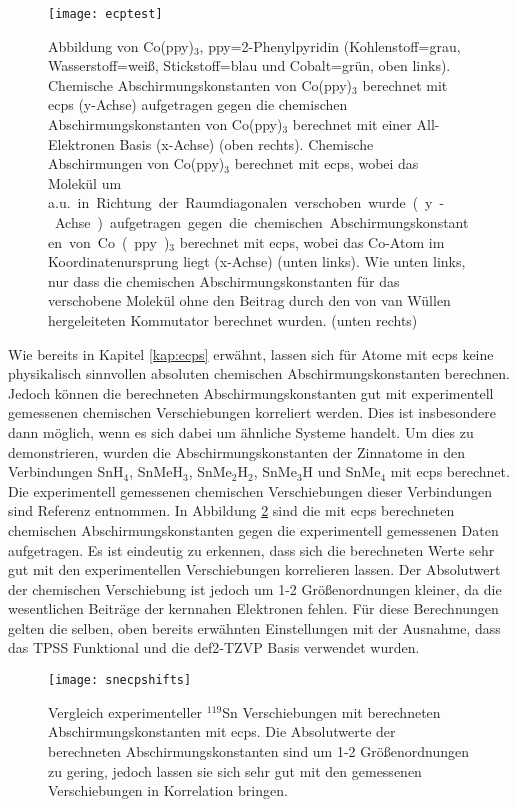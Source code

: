 \vfill
\newpage
\begin{figure}[ht!]
	\centering
	\texttt{[image: ecptest]}
	\captionsetup{figurewithin = chapter}
	\captionsetup{font=small, labelfont=bf}\caption[ECP-Testrechnungen an Co(ppy)$_3$]{Abbildung von Co(ppy)$_3$, ppy=2-Phenylpyridin (Kohlenstoff=grau, Wasserstoff=weiß, Stickstoff=blau und Cobalt=grün, oben links). Chemische Abschirmungskonstanten von Co(ppy)$_3$ berechnet mit \acp{ecp} (y-Achse) aufgetragen gegen die chemischen Abschirmungskonstanten von Co(ppy)$_3$ berechnet mit einer All-Elektronen Basis (x-Achse) (oben rechts). Chemische Abschirmungen von Co(ppy)$_3$  berechnet mit \acp{ecp}, wobei das Molekül um \unit[10]{a.u.} in Richtung der Raumdiagonalen verschoben wurde (y-Achse) aufgetragen gegen die chemischen Abschirmungskonstanten von Co(ppy)$_3$ berechnet mit \acp{ecp}, wobei das Co-Atom im Koordinatenursprung liegt (x-Achse) (unten links). Wie unten links, nur dass die chemischen Abschirmungskonstanten für das verschobene Molekül ohne den Beitrag durch den von van Wüllen hergeleiteten Kommutator berechnet wurden. (unten rechts)}
\label{abb:coppy3test}
\end{figure}
\vfill
\newpage

Wie bereits in Kapitel \ref{kap:ecps} erwähnt, lassen sich für Atome mit \acp{ecp} keine physikalisch sinnvollen absoluten chemischen Abschirmungskonstanten berechnen. Jedoch können die berechneten Abschirmungskonstanten gut mit experimentell gemessenen chemischen Verschiebungen korreliert werden. Dies ist insbesondere dann möglich, wenn es sich dabei um ähnliche Systeme handelt. Um dies zu demonstrieren, wurden die Abschirmungskonstanten der Zinnatome in den Verbindungen SnH$_4$, SnMeH$_3$, SnMe$_2$H$_2$, SnMe$_3$H und SnMe$_4$ mit \acp{ecp} berechnet. Die experimentell gemessenen chemischen Verschiebungen dieser Verbindungen sind Referenz \cite{vivas2002dft} entnommen. In Abbildung \ref{abb:snecpshifts} sind die mit \acp{ecp} berechneten chemischen Abschirmungskonstanten gegen die experimentell gemessenen Daten aufgetragen. Es ist eindeutig zu erkennen, dass sich die berechneten Werte sehr gut mit den experimentellen Verschiebungen korrelieren lassen. Der Absolutwert der chemischen Verschiebung ist jedoch um 1-2 Größenordnungen kleiner, da die wesentlichen Beiträge der kernnahen Elektronen fehlen. Für diese Berechnungen gelten die selben, oben bereits erwähnten Einstellungen mit der Ausnahme, dass das TPSS Funktional\supercite{tao2003climbing} und die def2-TZVP Basis\supercite{weigend2005balanced} verwendet wurden.
\begin{figure}[ht!]
	\centering
	\texttt{[image: snecpshifts]}
	\captionsetup{figurewithin = chapter}
	\captionsetup{font=small, labelfont=bf}\caption[Vergleich experimenteller $^{119}$Sn Verschiebungen mit berechneten Abschirmungskonstanten]{Vergleich experimenteller $^{119}$Sn Verschiebungen mit berechneten Abschirmungskonstanten mit \acp{ecp}. Die Absolutwerte der berechneten Abschirmungskonstanten sind um 1-2 Größenordnungen zu gering, jedoch lassen sie sich sehr gut mit den gemessenen Verschiebungen in Korrelation bringen.}
\label{abb:snecpshifts}
\end{figure}
	
